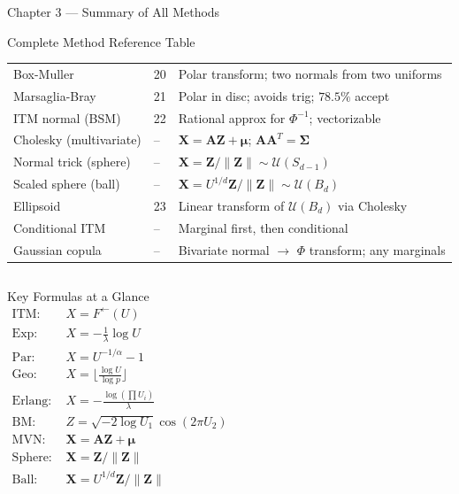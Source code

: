 \documentclass[aspectratio=169,10pt]{beamer}
\newcommand{\UU}{\mathcal{U}}
\begin{document}
\begin{frame}[allowframebreaks]{Chapter 3 --- Summary of All Methods}
\begin{block}{Complete Method Reference Table}
\begin{tabular}{@{}llp{4.8cm}@{}}
      Box-Muller & 20 & Polar transform; two normals from two uniforms \\
      Marsaglia-Bray & 21 & Polar in disc; avoids trig; $78.5\%$ accept \\
      ITM normal (BSM) & 22 & Rational approx for $\Phi^{-1}$; vectorizable \\
      Cholesky (multivariate) & -- & $\mathbf{X} = \mathbf{A}\mathbf{Z} + \boldsymbol{\mu}$; $\mathbf{A}\mathbf{A}^T = \boldsymbol{\Sigma}$ \\
      Normal trick (sphere) & -- & $\mathbf{X} = \mathbf{Z}/\|\mathbf{Z}\| \sim \UU(S_{d-1})$ \\
      Scaled sphere (ball) & -- & $\mathbf{X} = U^{1/d}\mathbf{Z}/\|\mathbf{Z}\| \sim \UU(B_d)$ \\
      Ellipsoid & 23 & Linear transform of $\UU(B_d)$ via Cholesky \\
      Conditional ITM & -- & Marginal first, then conditional \\
      Gaussian copula & -- & Bivariate normal $\to$ $\Phi$ transform; any marginals \\
      \bottomrule
    \end{tabular}
  \end{block}

\framebreak

  \begin{columns}
    \begin{block}{Key Formulas at a Glance}
      \begin{align*}
        \text{ITM: } & X = F^{\leftarrow}(U) \\[3pt]
        \text{Exp: } & X = -\tfrac{1}{\lambda}\log U \\[3pt]
        \text{Par: } & X = U^{-1/\alpha} - 1 \\[3pt]
        \text{Geo: } & X = \lfloor \tfrac{\log U}{\log p}\rfloor \\[3pt]
        \text{Erlang: } & X = -\tfrac{\log(\prod U_i)}{\lambda} \\[3pt]
        \text{BM: } & Z = \sqrt{-2\log U_1}\cos(2\pi U_2) \\[3pt]
        \text{MVN: } & \mathbf{X} = \mathbf{A}\mathbf{Z} + \boldsymbol{\mu} \\[3pt]
        \text{Sphere: } & \mathbf{X} = \mathbf{Z}/\|\mathbf{Z}\| \\[3pt]
        \text{Ball: } & \mathbf{X} = U^{1/d}\mathbf{Z}/\|\mathbf{Z}\|
      \end{align*}
    \end{block}


\end{columns}
\end{frame}
\end{document}
